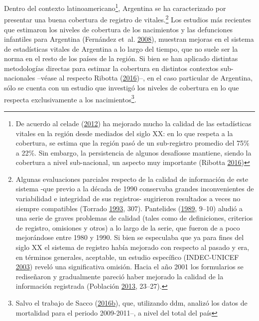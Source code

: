 \documentclass[12pt,spanish,]{article}
\let\rmarkdownfootnote\footnote%
\def\footnote{\protect\rmarkdownfootnote}
\begin{document}
Dentro del contexto latinoamericano\footnote{De acuerdo al \gls{celade}
  (\protect\hyperlink{ref-CELADE2012}{2012}) ha mejorado mucho la
  calidad de las estadísticas vitales en la región desde mediados del
  siglo XX: en lo que respeta a la cobertura, se estima que la región
  pasó de un sub-registro promedio del 75\% a 22\%. Sin embargo, la
  persistencia de algunos desafíosse mantiene, siendo la cobertura a
  nivel sub-nacional, un aspecto muy importante (Ribotta
  \protect\hyperlink{ref-Ribotta2016}{2016})}, Argentina se ha
caracterizado por presentar una buena cobertura de registro de
vitales.\footnote{Algunas evaluaciones parciales respecto de la calidad
  de información de este sistema -que previo a la década de 1990
  conservaba grandes inconvenientes de variabilidad e integridad de sus
  registros- sugirieron resultados a veces no siempre compatibles
  (Torrado \protect\hyperlink{ref-Torrado1993}{1993}, 307). Pantelides
  (\protect\hyperlink{ref-Pantelides1989}{1989}, 9--10) aludió a una
  serie de graves problemas de calidad (tales como de definiciones,
  criterios de registro, omisiones y otros) a lo largo de la serie, que
  fueron de a poco mejorándose entre 1980 y 1990. Si bien se especulaba
  que ya para fines del siglo XX el sistema de registro había mejorado
  con respecto al pasado y era, en términos generales, aceptable, un
  estudio específico (INDEC-UNICEF
  \protect\hyperlink{ref-INDEC-UNICEF2003}{2003}) reveló una
  significativa omisión. Hacia el año 2001 los formularios se
  rediseñaron y gradualmente pareció haber mejorado la calidad de la
  información registrada (Población
  \protect\hyperlink{ref-Poblacion2013}{2013}, 23--27).} Los estudios
más recientes que estimaron los niveles de cobertura de los nacimientos
y las defunciones infantiles para Argentina (Fernández et~al.
\protect\hyperlink{ref-FernandezEtAl2008}{2008}), muestran mejoras en el
sistema de estadísticas vitales de Argentina a lo largo del tiempo, que
no suele ser la norma en el resto de los países de la región. Si bien se
han aplicado distintas metodologías directas para estimar la cobertura
en distintos contextos sub-nacionales --véase al respecto Ribotta
(\protect\hyperlink{ref-Ribotta2016}{2016})--, en el caso particular de
Argentina, sólo se cuenta con un estudio que investigó los niveles de
cobertura en lo que respecta exclusivamente a los nacimientos\footnote{Salvo
  el trabajo de Sacco
  (\protect\hyperlink{ref-Sacco2016a}{2016}\protect\hyperlink{ref-Sacco2016a}{b}),
  que, utilizando \gls{ddm}, analizó los datos de mortalidad para el
  periodo 2009-2011--, a nivel del total del país}.
\end{document}
